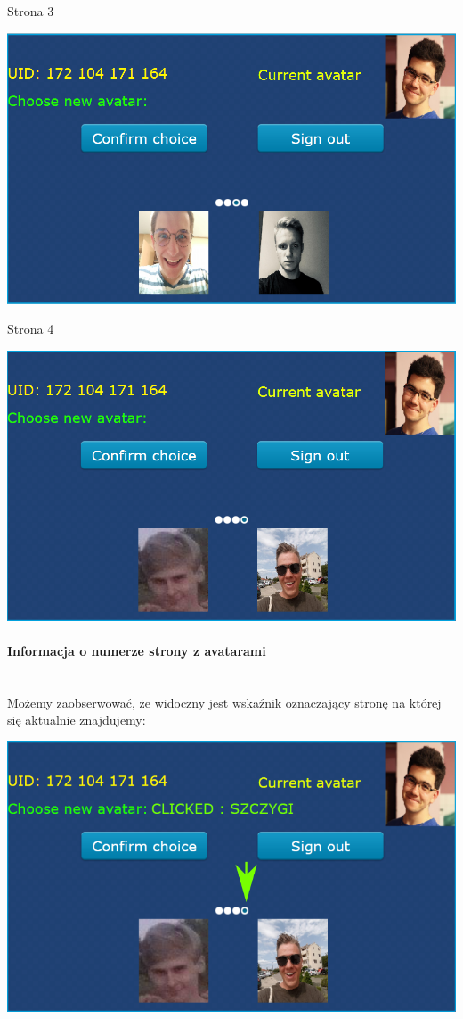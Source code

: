 \documentclass[12pt,hidelinks]{article}
\newcommand{\subsubsubsection}[1]{\paragraph{#1}\mbox{}\\}
\begin{document}
    \newpage
    Strona 3
    \begin{center}
        \includegraphics[scale=0.75]{img/screen2-page3.png}
    \end{center}

    Strona 4
    \begin{center}
        \includegraphics[scale=0.75]{img/screen2-page4.png}
    \end{center}

    \newpage

    \subsubsubsection{Informacja o numerze strony z avatarami}
    Możemy zaobserwować, że widoczny jest wskaźnik oznaczający stronę na której się aktualnie znajdujemy:

    \begin{center}
        \includegraphics[scale=0.75]{img/screen2-page-indicator.png}
    \end{center}
\end{document}
